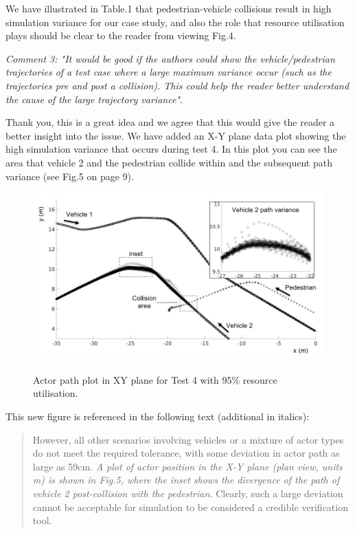 \documentclass[11pt, a4paper]{letter} %
\begin{document}
\begin{letter}
We have illustrated in Table.1 that pedestrian-vehicle collisions result in high simulation variance for our case study, and also the role that resource utilisation plays should be clear to the reader from viewing Fig.4.


\bigskip

\textit{Comment 3: "It would be good if the authors could show the vehicle/pedestrian trajectories of a test case where a large maximum variance occur (such as the trajectories pre and post a collision). This could help the reader better understand the cause of the large trajectory variance"}.

Thank you, this is a great idea and we agree that this would give the reader a better insight into the issue. We have added an X-Y plane data plot showing the high simulation variance that occurs during test 4. In this plot you can see the area that vehicle 2 and the pedestrian collide within and the subsequent path variance (see Fig.5 on page 9). 

\begin{figure}
    \centering
    \includegraphics[width=12cm]{../document/other/figures/actor_path_plot.jpg}
    \caption{\\Actor path plot in XY plane for Test 4 with 95\% resource utilisation.}
\end{figure}


This new figure is referenced in the following text (additional in italics):
\begin{quote}
However, all other scenarios involving vehicles or a mixture of actor types do not meet the required tolerance, with some deviation in actor path as large as 59cm. \textit{A plot of actor position in the X-Y plane (plan view, units m) is shown in Fig.5, where the inset shows the divergence of the path of vehicle 2 post-collision with the pedestrian.} Clearly, such a large deviation cannot be acceptable for simulation to be considered a credible verification tool.
\end{quote}


\end{letter}
\end{document}

